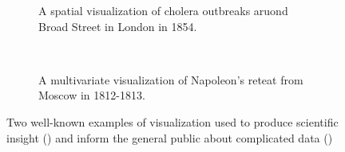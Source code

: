 \begin{figure}
  \centering
  \begin{subfigure}{0.4\textwidth}
    \caption{A spatial visualization of cholera outbreaks aruond Broad Street in London in 1854.}
    \label{fig:motivation:example:cholera}
  \end{subfigure}
  ~
  \begin{subfigure}{0.4\textwidth}
    \caption{A multivariate visualization of Napoleon's reteat from Moscow in 1812-1813.}
    \label{fig:motivation:example:napoleon}
  \end{subfigure}
  \caption{Two well-known examples of visualization used to produce scientific insight () and inform the general public about complicated data ()}
  \label{fig:motivation:example}
\end{figure}

